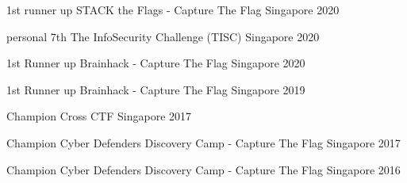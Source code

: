 



\begin{cvhonors}

  \cvhonor
    {1st runner up} %
    {STACK the Flags - Capture The Flag} %
    {Singapore} %
    {2020} %

  \cvhonor
    {personal 7th} %
    {The InfoSecurity Challenge (TISC)} %
    {Singapore} %
    {2020} %

  \cvhonor
    {1st Runner up} %
    {Brainhack - Capture The Flag} %
    {Singapore} %
    {2020} %

  \cvhonor
    {1st Runner up} %
    {Brainhack - Capture The Flag} %
    {Singapore} %
    {2019} %

  \cvhonor
    {Champion} %
    {Cross CTF} %
    {Singapore} %
    {2017} %

  \cvhonor
    {Champion} %
    {Cyber Defenders Discovery Camp - Capture The Flag} %
    {Singapore} %
    {2017} %

  \cvhonor
    {Champion} %
    {Cyber Defenders Discovery Camp - Capture The Flag} %
    {Singapore} %
    {2016} %

\end{cvhonors}


